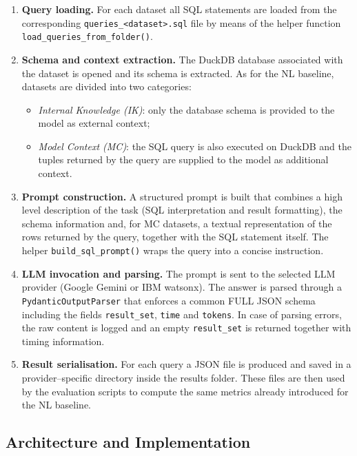 \documentclass[12pt,a4paper]{article}
\begin{document}
\begin{enumerate}
  \item \textbf{Query loading.}
  For each dataset all SQL statements are loaded from the corresponding
  \texttt{queries\_\textless dataset\textgreater{}.sql} file by means of the
  helper function \texttt{load\_queries\_from\_folder()}.

  \item \textbf{Schema and context extraction.}
  The DuckDB database associated with the dataset is opened and its schema is
  extracted. As for the NL baseline, datasets are divided into two categories:
  \begin{itemize}
    \item \emph{Internal Knowledge (IK)}: only the database schema is provided
    to the model as external context;
    \item \emph{Model Context (MC)}: the SQL query is also executed on DuckDB
    and the tuples returned by the query are supplied to the model as
    additional context.
  \end{itemize}

  \item \textbf{Prompt construction.}
  A structured prompt is built that combines a high level description of the
  task (SQL interpretation and result formatting), the schema information and,
  for MC datasets, a textual representation of the rows returned by the query,
  together with the SQL statement itself. The helper
  \texttt{build\_sql\_prompt()} wraps the query into a concise instruction.

  \item \textbf{LLM invocation and parsing.}
  The prompt is sent to the selected LLM provider (Google Gemini or IBM
  watsonx). The answer is parsed through a \texttt{PydanticOutputParser} that
  enforces a common FULL JSON schema including the fields
  \texttt{result\_set}, \texttt{time} and \texttt{tokens}. In case of parsing
  errors, the raw content is logged and an empty \texttt{result\_set} is
  returned together with timing information.

  \item \textbf{Result serialisation.}
  For each query a JSON file is produced and saved in a provider--specific
  directory inside the results folder. These files are then used by the
  evaluation scripts to compute the same metrics already introduced for the NL
  baseline.
\end{enumerate}

\subsection{Architecture and Implementation}
\end{document}
